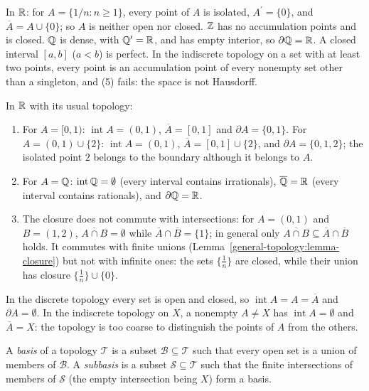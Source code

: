 \begin{example}\label{general-topology:example-accumulation}
In $\mathbb{R}$: for $A = \{1/n : n \geq 1\}$, every point of $A$ is isolated, $A^{\prime} = \{0\}$, and $\overline{A} = A \cup \{0\}$; so $A$ is neither open nor closed. $\mathbb{Z}$ has no accumulation points
and is closed. $\mathbb{Q}$ is dense, with $\mathbb{Q}^{\prime} = \mathbb{R}$, and has empty interior, so $\partial\mathbb{Q} = \mathbb{R}$. A closed interval $[a, b]$ ($a < b$) is perfect. In the indiscrete topology on a set with at
least two points, every point is an accumulation point of every nonempty set other than a singleton, and (5) fails: the space is not Hausdorff.
\end{example}

\begin{example}\label{general-topology:example-closure-computations}
In $\mathbb{R}$ with its usual topology:
\begin{enumerate}
\item For $A = [0, 1)$: $\operatorname{int}A = (0, 1)$, $\overline{A} = [0, 1]$ and $\partial A = \{0, 1\}$. For $A = (0, 1) \cup \{2\}$: $\operatorname{int}A = (0, 1)$, $\overline{A} = [0, 1] \cup \{2\}$, and
$\partial A = \{0, 1, 2\}$; the isolated point $2$ belongs to the boundary although it belongs to $A$.
\item For $A = \mathbb{Q}$: $\operatorname{int}\mathbb{Q} = \emptyset$ (every interval contains irrationals), $\overline{\mathbb{Q}} = \mathbb{R}$ (every interval contains rationals), and $\partial\mathbb{Q} = \mathbb{R}$.
\item The closure does not commute with intersections: for $A = (0, 1)$ and $B = (1, 2)$, $\overline{A \cap B} = \emptyset$ while $\overline{A} \cap \overline{B} = \{1\}$; in general only
$\overline{A \cap B} \subseteq \overline{A} \cap \overline{B}$ holds. It commutes with finite unions (Lemma~\ref{general-topology:lemma-closure}) but not with infinite ones: the sets $\{\frac1n\}$ are closed,
while their union has closure $\{\frac1n\} \cup \{0\}$.
\end{enumerate}
In the discrete topology every set is open and closed, so $\operatorname{int}A = A = \overline{A}$ and $\partial A = \emptyset$. In the indiscrete topology on $X$, a nonempty $A \neq X$ has
$\operatorname{int}A = \emptyset$ and $\overline{A} = X$: the topology is too coarse to distinguish the points of $A$ from the others.
\end{example}

\begin{definition}\label{general-topology:definition-basis}
A \emph{basis} of a topology $\mathcal{T}$ is a subset $\mathcal{B} \subseteq \mathcal{T}$ such that every open set is a union of members
of $\mathcal{B}$. A \emph{subbasis} is a subset $\mathcal{S} \subseteq \mathcal{T}$ such that the finite intersections of members of $\mathcal{S}$
(the empty intersection being $X$) form a basis.
\end{definition}

